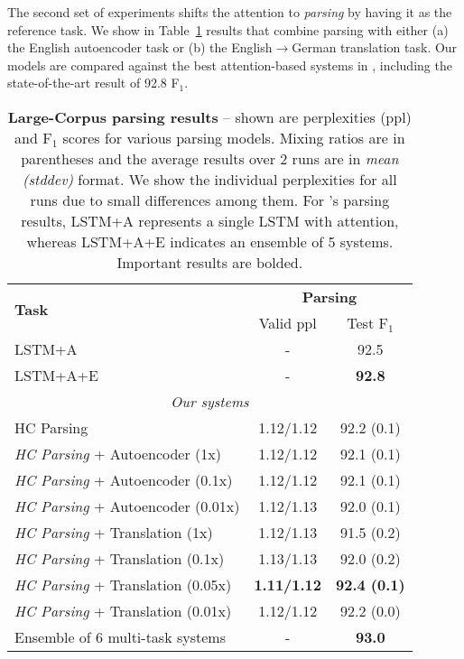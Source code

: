 The second set of experiments shifts the attention to {\it parsing} by having it as the reference task. 
We show in Table~\ref{t:big_big_parsing} results that combine parsing with
either (a) the English autoencoder task or (b) the English$\rightarrow$German
translation task. Our models are compared against the best attention-based systems in
\citep{vinyals15grammar}, including the state-of-the-art result of 92.8 F$_1$.

\begin{table}[tbh!]
\centering
\begin{tabular}{l|c|c}
\multirow{ 2}{*}{\bf{Task}}& \multicolumn{2}{c}{{\bf
Parsing}}\\
  \cline{2-3}
  & Valid ppl & Test F$_1$\\
  \hline
  \hline
LSTM+A \citep{vinyals15grammar} &  - & 92.5 \\
LSTM+A+E \citep{vinyals15grammar} & - & {\bf 92.8} \\
  \hline
\multicolumn{3}{c}{{\it Our systems}} \\
  \hline
HC Parsing & 1.12/1.12 & 92.2 (0.1) \\
  \hline
{\it HC Parsing} + Autoencoder (1x) & 1.12/1.12 & 92.1 (0.1) \\
{\it HC Parsing} + Autoencoder (0.1x) & 1.12/1.12 & 92.1 (0.1) \\
{\it HC Parsing} + Autoencoder (0.01x) & 1.12/1.13 & 92.0 (0.1) \\
  \hline
{\it HC Parsing} + Translation (1x) & 1.12/1.13 & 91.5 (0.2) \\
{\it HC Parsing} + Translation (0.1x) & 1.13/1.13 & 92.0 (0.2) \\
{\it HC Parsing} + Translation (0.05x) & {\bf 1.11/1.12} & {\bf 92.4 (0.1)} \\
{\it HC Parsing} + Translation (0.01x) & 1.12/1.12 & 92.2 (0.0) \\
  \hline
Ensemble of 6 multi-task systems & - & {\bf 93.0} \\
\end{tabular}
\caption[Large-Corpus parsing results \& translation]{{\bf Large-Corpus parsing results} -- shown are
perplexities (ppl) and F$_1$ scores 
for various parsing models. Mixing ratios are in parentheses and the average
results over 2 runs are in {\it mean (stddev)} format. We show the individual perplexities for all runs
due to small differences among them. For \citet{vinyals15grammar}'s parsing results, LSTM+A
represents a single LSTM with attention, whereas LSTM+A+E indicates an ensemble
of 5 systems. Important results are bolded.}
\label{t:big_big_parsing}
\end{table}


